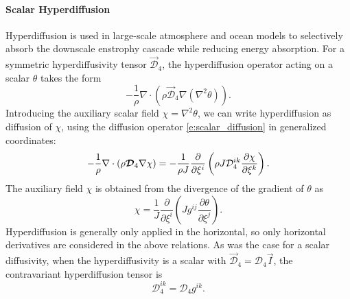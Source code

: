 \documentclass{report}
\begin{document}
\paragraph{Scalar Hyperdiffusion} Hyperdiffusion is used in large-scale atmosphere and ocean models to selectively absorb the downscale enstrophy cascade while reducing energy absorption.  For a symmetric hyperdiffusivity tensor $\vec{\mathcal{D}}_4$, the hyperdiffusion operator acting on a scalar $\theta$ takes the form 
\begin{equation}\label{e:hyperdiff_scalar}
    -\frac{1}{\rho} \nabla \cdot \left(\rho \vec{\mathcal{D}}_4 \nabla (\nabla^2 \theta)\right).
\end{equation}
Introducing the auxiliary scalar field $\chi = \nabla^2 \theta$, we can write hyperdiffusion as diffusion of $\chi$, using the diffusion operator \eqref{e:scalar_diffusion} in generalized coordinates:
\begin{equation}
 -\frac{1}{\rho} \nabla \cdot (\rho \vec{\mathcal{D}}_4 \nabla  \chi) \\
 = - \frac{1}{\rho J} \frac{\partial}{\partial \xi^i} \left(\rho J \mathcal{D}_4^{ik} \frac{\partial \chi}{\partial \xi^k}\right).
\end{equation}
The auxiliary field $\chi$ is obtained from the divergence of the gradient of $\theta$ as 
\begin{equation}
    \chi = \frac{1}{J} \frac{\partial}{\partial\xi^i} \left( J  g^{ij} \frac{\partial\theta}{\partial\xi^j} \right).
\end{equation}
Hyperdiffusion is generally only applied in the horizontal, so only horizontal derivatives are considered in the above relations. As was the case for a scalar diffusivity, when the hyperdiffusivity is a scalar with $\vec{\mathcal{D}}_4 = \mathcal{D}_4 \vec{I}$, the contravariant hyperdiffusion tensor is
\[
\mathcal{D}_4^{ik} = \mathcal{D}_4 g^{ik}.
\]
\end{document}
